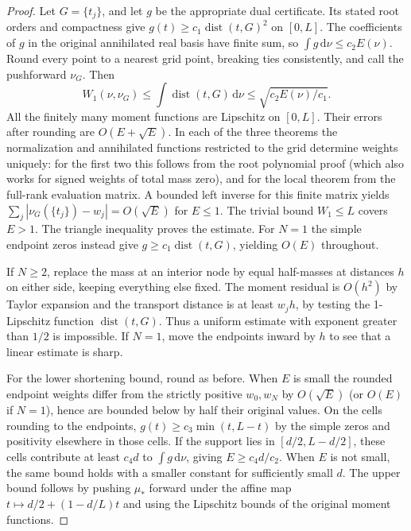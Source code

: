 \documentclass[11pt]{article}
\theoremstyle{remark}\newtheorem{remark}[theorem]{Remark}
\newcommand{\dd}{\,\mathrm d}
\newcommand{\dist}{\operatorname{dist}}
\begin{document}
\begin{proof}
Let $G=\{t_j\}$, and let $g$ be the appropriate dual certificate. Its stated root orders and compactness give $g(t)\ge c_1\dist(t,G)^2$ on $[0,L]$. The coefficients of $g$ in the original annihilated real basis have finite sum, so $\int g\dd\nu\le c_2 E(\nu)$. Round every point to a nearest grid point, breaking ties consistently, and call the pushforward $\nu_G$. Then
\[
 W_1(\nu,\nu_G)\le \int\dist(t,G)\dd\nu\le \sqrt{c_2 E(\nu)/c_1}.
\]
All the finitely many moment functions are Lipschitz on $[0,L]$. Their errors after rounding are $O(E+\sqrt E)$. In each of the three theorems the normalization and annihilated functions restricted to the grid determine weights uniquely: for the first two this follows from the root polynomial proof (which also works for signed weights of total mass zero), and for the local theorem from the full-rank evaluation matrix. A bounded left inverse for this finite matrix yields $\sum_j|\nu_G(\{t_j\})-w_j|=O(\sqrt E)$ for $E\le1$. The trivial bound $W_1\le L$ covers $E>1$. The triangle inequality proves the estimate. For $N=1$ the simple endpoint zeros instead give $g\ge c_1\dist(t,G)$, yielding $O(E)$ throughout.

If $N\ge2$, replace the mass at an interior node by equal half-masses at distances $h$ on either side, keeping everything else fixed. The moment residual is $O(h^2)$ by Taylor expansion and the transport distance is at least $w_jh$, by testing the 1-Lipschitz function $\dist(t,G)$. Thus a uniform estimate with exponent greater than $1/2$ is impossible. If $N=1$, move the endpoints inward by $h$ to see that a linear estimate is sharp.

For the lower shortening bound, round as before. When $E$ is small the rounded endpoint weights differ from the strictly positive $w_0,w_N$ by $O(\sqrt E)$ (or $O(E)$ if $N=1$), hence are bounded below by half their original values. On the cells rounding to the endpoints, $g(t)\ge c_3\min(t,L-t)$ by the simple zeros and positivity elsewhere in those cells. If the support lies in $[d/2,L-d/2]$, these cells contribute at least $c_4d$ to $\int g\dd\nu$, giving $E\ge c_4d/c_2$. When $E$ is not small, the same bound holds with a smaller constant for sufficiently small $d$. The upper bound follows by pushing $\mu_*$ forward under the affine map $t\mapsto d/2+(1-d/L)t$ and using the Lipschitz bounds of the original moment functions.\end{proof}
\end{document}
